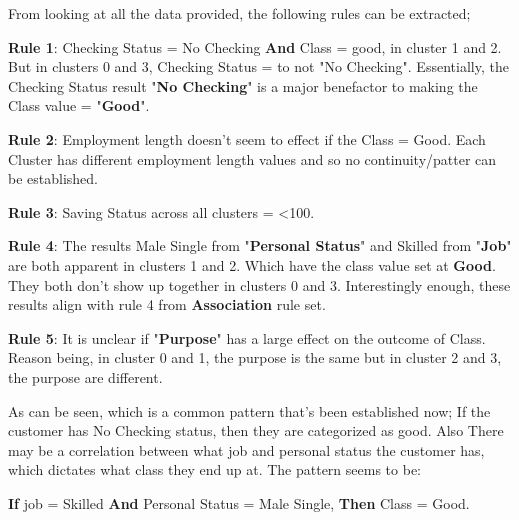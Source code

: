 \documentclass[12pt, a4paper]{article}
\begin{document}
    From looking at all the data provided, the following rules can be extracted;
    
    \textbf{Rule 1}: Checking Status = No Checking \textbf{And} Class = good, in cluster 1 and 2. But in clusters 0 and 3, Checking Status = to not "No Checking". Essentially, the Checking Status result "\textbf{No Checking}" is a major benefactor to making the Class value = "\textbf{Good}".
    
    \textbf{Rule 2}: Employment length doesn't seem to effect if the Class = Good. Each Cluster has different employment length values and so no continuity/patter can be established.
    
    \textbf{Rule 3}: Saving Status across all clusters = <100.
    
    \textbf{Rule 4}: The results Male Single from "\textbf{Personal Status}" and Skilled from "\textbf{Job}" are both apparent in clusters 1 and 2. Which have the class value set at \textbf{Good}. They both don't show up together in clusters 0 and 3. Interestingly enough, these results align with rule 4 from \textbf{Association} rule set.
    
    \textbf{Rule 5}: It is unclear if "\textbf{Purpose}" has a large effect on the outcome of Class. Reason being, in cluster 0 and 1, the purpose is the same but in cluster 2 and 3, the purpose are different.
    
    As can be seen, which is a common pattern that's been established now; If the customer has No Checking status, then they are categorized as good. Also There may be a correlation between what job and personal status the customer has, which dictates what class they end up at. The pattern seems to be: 
    
    \textbf{If} job = Skilled \textbf{And} Personal Status = Male Single, \textbf{Then} Class = Good.
    
    
    
    
    
 
	
	
\end{document}
